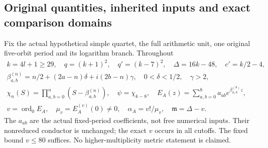 \documentclass[11pt,a4paper]{article}
\begin{document}
\subsection{Original quantities, inherited inputs and exact comparison domains}
Fix the actual hypothetical simple quartet, the full arithmetic unit, one original
five-orbit period and its logarithm branch. Throughout
\begin{equation}
\begin{gathered}
 k=4l+1\ge29,\quad q=(k+1)^2,\quad q'=(k-7)^2,\quad
 \Delta=16k-48,\quad c'=k/2-4,\\
 \beta_{a,b}^{(n)}=n/2+(2a-n)\delta+i(2b-n)\gamma,
 \quad0<\delta<1/2,\quad\gamma>2,\\
 \chi_n(S)=\prod_{a,b=0}^n(S-\beta_{a,b}^{(n)}),\quad
 \psi=\chi_{k-8},\quad E_A(z)=\sum_{a,b=0}^8a_{ab}e^{\beta_{a,b}^{(8)}z},\\
 v=\operatorname{ord}_0E_A,\quad\mu_v=E_A^{(v)}(0)\ne0,
 \quad\alpha_A=v!/\mu_v,\quad\mathfrak m=\Delta-v.
\end{gathered}\label{EOR:eq:data}
\tag{EOR1}
\end{equation}
The $a_{ab}$ are the actual fixed-period coefficients, not free numerical inputs.
Their nonreduced conductor is unchanged; the exact $v$ occurs in all cutoffs.
The fixed bound $v\le80$ suffices. No higher-multiplicity metric statement is claimed.
\end{document}
